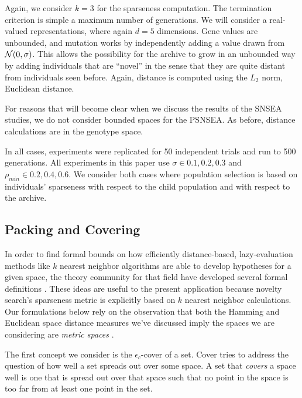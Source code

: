 \documentclass[twoside]{article}
\begin{document}
Again, we consider $k=3$ for the sparseness computation.  The termination criterion is simple a maximum number of generations.  We will consider a real-valued representations, where again $d=5$ dimensions.  Gene values are unbounded, and mutation works by independently adding a value drawn from ${\cal N}(0,\sigma)$.  This allows the possibility for the archive to grow in an unbounded way by adding individuals that are ``novel'' in the sense that they are quite distant from individuals seen before.  Again, distance is computed using the $L_2$ norm, Euclidean distance.

For reasons that will become clear when we discuss the results of the SNSEA studies, we do not consider bounded spaces for the PSNSEA.  As before, distance calculations are in the genotype space.

In all cases, experiments were replicated for 50 independent trials and run to 500 generations. All experiments in this paper use $\sigma\in{0.1,0.2,0.3}$ and $\rho_{min} \in {0.2,0.4,0.6}$.  We consider both cases where population selection is based on individuals' sparseness with respect to the child population and with respect to the archive.


\subsection{Packing and Covering}
\label{subsec:knn}

In order to find formal bounds on how efficiently distance-based, lazy-evaluation methods like $k$ nearest neighbor algorithms are able to develop hypotheses for a given space, the theory community for that field have developed several formal definitions \cite{Clarkson1999dcg}.  These ideas are useful to the present application because novelty search's sparseness metric is explicitly based on $k$ nearest neighbor calculations.  Our formulations below rely on the observation that both the Hamming and Euclidean space distance measures we've discussed imply the spaces we are considering are \emph{metric spaces} \cite{??}.

The first concept we consider is the $\epsilon_c$-cover of a set.  Cover tries to address the question of how well a set spreads out over some space.  A set that \emph{covers} a space well is one that is spread out over that space such that no point in the space is too far from at least one point in the set.
\end{document}
